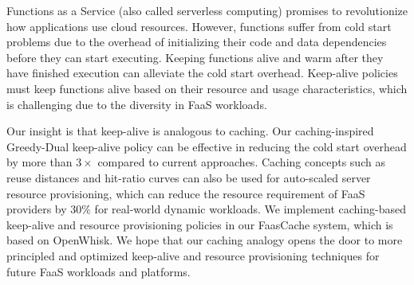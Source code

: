 
Functions as a Service (also called serverless computing) promises to revolutionize how applications use cloud resources. 
However, functions suffer from cold start problems due to the overhead of initializing their code and data dependencies before they can start executing. 
Keeping functions alive and warm after they have finished execution can alleviate the cold start overhead. 
Keep-alive policies must keep functions alive based on their resource and usage characteristics, which is challenging due to the diversity in FaaS workloads. 


Our insight is that keep-alive is analogous to caching.
Our caching-inspired Greedy-Dual keep-alive policy can be effective in reducing the cold start overhead by more than $3\times$ compared to current approaches. 
Caching concepts such as reuse distances and hit-ratio curves can also be used for auto-scaled server resource provisioning, which can reduce the resource requirement of FaaS providers by $30\%$ for real-world dynamic workloads. 
We implement caching-based keep-alive and resource provisioning policies in our FaasCache system, which is based on OpenWhisk. 
We hope that our caching analogy opens the door to more principled and optimized keep-alive and resource provisioning techniques for future FaaS workloads and platforms. 



